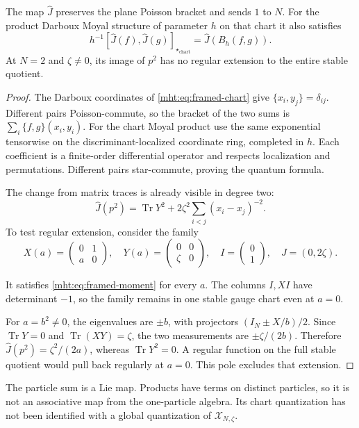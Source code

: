 \begin{proposition}\label{mht:prop:framed-particle}
The map $\widehat J$ preserves the plane Poisson bracket and
sends $1$ to $N$. For the product Darboux Moyal structure of
parameter $h$ on that chart it also satisfies
\[
 h^{-1}[\widehat J(f),\widehat J(g)]_{\star_{\mathrm{chart}}}
       =\widehat J(B_h(f,g)).
\]
At $N=2$ and $\zeta\ne0$, its image of $p^2$ has no regular
extension to the entire stable quotient.
\end{proposition}
\begin{proof}
The Darboux coordinates of \eqref{mht:eq:framed-chart}
give $\{x_i,y_j\}=\delta_{ij}$. Different pairs Poisson-commute,
so the bracket of the two sums is
$\sum_i\{f,g\}(x_i,y_i)$. For the chart Moyal product use
the same exponential tensorwise on the discriminant-localized
coordinate ring, completed in $h$. Each coefficient is a
finite-order differential operator and respects localization
and permutations. Different pairs star-commute, proving the
quantum formula.

The change from matrix traces is already visible in degree two:
\[
 \widehat J(p^2)=\operatorname{Tr}Y^2
                +2\zeta^2\sum_{i<j}(x_i-x_j)^{-2}.
\]
To test regular extension, consider the family
\[
 X(a)=\begin{pmatrix}0&1\\a&0\end{pmatrix},\quad
 Y(a)=\begin{pmatrix}0&0\\\zeta&0\end{pmatrix},\quad
 I=\begin{pmatrix}0\\1\end{pmatrix},\quad J=(0,2\zeta).
\]

It satisfies \eqref{mht:eq:framed-moment} for every $a$.
The columns $I,XI$ have determinant $-1$, so the family remains
in one stable gauge chart even at $a=0$.

For $a=b^2\ne0$, the eigenvalues are $\pm b$, with projectors
$(I_N\pm X/b)/2$. Since $\operatorname{Tr}Y=0$ and
$\operatorname{Tr}(XY)=\zeta$, the two measurements are
$\pm\zeta/(2b)$. Therefore
$\widehat J(p^2)=\zeta^2/(2a)$, whereas $\operatorname{Tr}Y^2=0$.
A regular function on the full stable quotient would pull
back regularly at $a=0$. This pole excludes that extension.
\end{proof}

The particle sum is a Lie map. Products have terms on distinct
particles, so it is not an associative map from the one-particle
algebra. Its chart quantization has not been
identified with a global quantization of
$\mathcal X_{N,\zeta}$.

